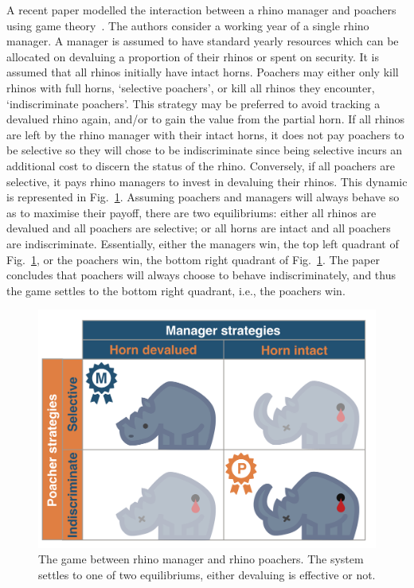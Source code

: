 \documentclass[10pt]{article}
\begin{document}
A recent paper modelled the interaction between a rhino manager and poachers
using game theory~\cite{Lee}. The authors consider a working year of a single
rhino manager. A manager is assumed to have standard yearly resources which
can be allocated on devaluing a proportion of their rhinos or spent on security.
It is assumed that all rhinos initially have intact horns. Poachers may either only
kill rhinos with full horns, `selective poachers', or kill all rhinos they encounter,
`indiscriminate poachers'. This strategy may be preferred to avoid tracking a 
devalued rhino again, and/or to gain the value from the partial horn. If all rhinos
are left by the rhino manager with their intact horns, it does not pay poachers to
be selective so they will chose to be indiscriminate since being selective incurs
an additional cost to discern the status of the rhino. Conversely, if all poachers are
selective, it pays rhino managers to invest in devaluing their rhinos. This dynamic
is represented in Fig.~\ref{fig:RhinoPic}. Assuming poachers and managers will
always behave so as to maximise their payoff, there are two equilibriums: either
all rhinos are devalued and all poachers are selective;
or all horns are intact and all poachers are indiscriminate. Essentially, either
the managers win, the top left quadrant of Fig.~\ref{fig:RhinoPic}, or the poachers
win, the bottom right quadrant of Fig.~\ref{fig:RhinoPic}. The paper~\cite{Lee}
concludes that poachers will always choose to behave indiscriminately, and thus
the game settles to the bottom right quadrant, i.e., the poachers win.

\begin{figure}[!htbp]
    \centering
    \includegraphics[scale=0.2]{images/RhinoPic.pdf}
    \caption{\label{fig:RhinoPic} The game between rhino manager and rhino
    poachers. The system settles to one of two equilibriums, either devaluing is
    effective or not.}
\end{figure}
\end{document}
